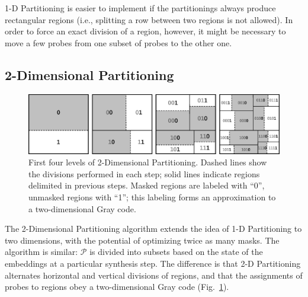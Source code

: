 \documentclass{w-edbk}
\newcommand{\optional}[1]{}
\begin{document}
1-D Partitioning is easier to implement if the partitionings always produce
rectangular regions (i.e., splitting a row between two regions is not allowed).
In order to force an exact division of a region, however, it might be necessary
to move a few probes from one subset of probes to the other one.

\optional{%
For example, imagine that a chip with $|\mathcal{P}| = 900$ probes, $n_r = 30$
rows and $n_c = 30$ columns is to be partitioned based on the state of the
embeddings at the first synthesis step, resulting in sub-sets $\mathcal{P}_0$
and $\mathcal{P}_1$ with, say, 638 and 262 probes, respectively. The chip must
thus be divided into two sub-regions, the upper one containing $[30 \cdot
638/900]=21$ rows and the lower one with $[30 \cdot 262/900]=9$ rows ($[x]$ is
$x$ rounded to the nearest integer). The problem is that the upper region then
contains $21 \cdot 30 = 630$ spots but it has to accommodate 638 probes,
whereas the lower region contains $9 \cdot 30 = 270$ spots but only 262
probes. The solution is to (arbitrarily) move 8 probes from $\mathcal{P}_0$ to
$\mathcal{P}_1$, which, results in some imperfections in the layers
of the corresponding mask (a few masked spots in a region of unmasked spots,
for instance).
}


\subsection{2-Dimensional Partitioning}

\begin{figure}\centering
\includegraphics[width=\textwidth]{figures/2dpart.eps}
\caption{\label{fig:2dpart}%
  First four levels of 2-Dimensional Partitioning. Dashed lines show
  the divisions performed in each step; solid lines indicate regions
  delimited in previous steps. Masked regions are labeled with ``0'',
  unmasked regions with ``1''; this labeling forms an approximation to
  a two-dimensional Gray code.}%
\end{figure}

The 2-Dimensional Partitioning algorithm extends the idea of 1-D
Partitioning to two dimensions, with the potential of optimizing twice
as many masks. The algorithm is similar: $\mathcal{P}$ is divided into
subsets based on the state of the embeddings at a particular
synthesis step. The difference is that 2-D Partitioning alternates
horizontal and vertical divisions of regions, and that the assignments
of probes to regions obey a two-dimensional Gray code
(Fig.~\ref{fig:2dpart}).
\end{document}
